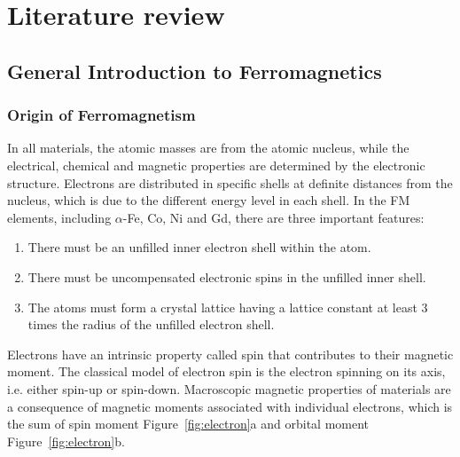 \chapter{Literature review}
\section{General Introduction to Ferromagnetics}

\subsection{Origin of Ferromagnetism}
In all materials, the atomic masses are from the atomic nucleus, while the electrical, chemical and magnetic properties are determined by the electronic structure. Electrons are distributed in specific shells at definite distances from the nucleus, which is due to the different energy level in each shell. In the FM elements, including $\alpha$-Fe, Co, Ni and Gd, there are three important features:

\begin{enumerate}
\item There must be an unfilled inner electron shell within the atom.
\item There must be uncompensated electronic spins in the unfilled inner shell.
\item The atoms must form a crystal lattice having a lattice constant at least 3
times the radius of the unfilled electron shell.
\end{enumerate}

Electrons have an intrinsic property called spin that contributes to their magnetic moment. The classical model of electron spin is the electron spinning on its
axis, i.e. either spin-up or spin-down. Macroscopic magnetic properties of materials are a consequence of magnetic moments associated with individual electrons, which is the sum of spin moment Figure~\ref{fig:electron}a and orbital moment Figure~\ref{fig:electron}b.

